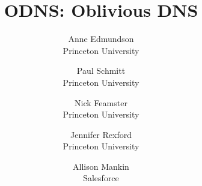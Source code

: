 \documentclass[letterpaper,twocolumn,10pt]{article}
\begin{document}

\newcommand{\ie}{{\em i.e.\xspace}}
\newcommand{\eg}{{\em e.g.\xspace}}
\newcommand{\ea}{{\em et al.\xspace}}
\newcommand{\etc}{{\em etc.}\xspace}
\def\UrlBreaks{\do\/\do-}

\graphicspath{ {./figures/} }

\date{}

\title{\LARGE{\bf ODNS: Oblivious DNS}}

\author{
{\rm Anne Edmundson}\\
Princeton University
\and
{\rm Paul Schmitt}\\
Princeton University
 \and
 {\rm Nick Feamster}\\
Princeton University
 \and
 {\rm Jennifer Rexford}\\
Princeton University
 \and
 {\rm Allison Mankin}\\
Salesforce
} %

\maketitle

\thispagestyle{empty}










\label{lastpage}

{\footnotesize 
}


\end{document}
